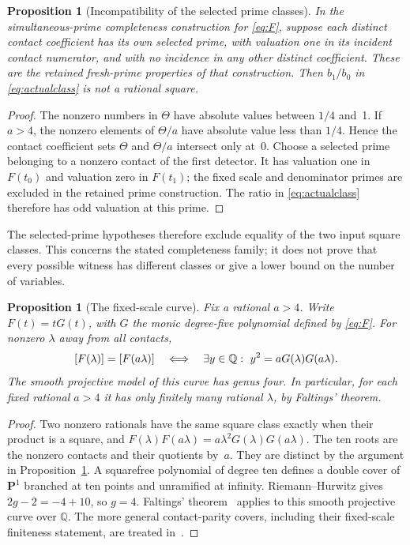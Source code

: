\documentclass[11pt,a4paper]{article}
\newtheorem{proposition}[theorem]{Proposition}
\theoremstyle{definition}\newtheorem{definition}[theorem]{Definition}
\theoremstyle{remark}\newtheorem{remark}[theorem]{Remark}
\newcommand{\Q}{\mathbb Q}\newcommand{\Z}{\mathbb Z}
\begin{document}
\begin{proposition}[Incompatibility of the selected prime classes]
\label{prop:fresh}
In the simultaneous-prime completeness construction for
\eqref{eq:F}, suppose each distinct contact coefficient has its own
selected prime, with valuation one in its incident contact numerator,
and with no incidence in any other distinct coefficient. These are the
retained fresh-prime properties of that construction. Then
$b_1/b_0$ in \eqref{eq:actualclass} is not a rational square.
\end{proposition}
\begin{proof}
The nonzero numbers in $\Theta$ have absolute values between $1/4$ and~1.
If $a>4$, the nonzero elements of $\Theta/a$ have absolute value less
than $1/4$. Hence the contact coefficient sets $\Theta$ and $\Theta/a$
intersect only at~0. Choose a selected prime belonging to a nonzero
contact of the first detector. It has valuation one in $F(t_0)$ and
valuation zero in $F(t_1)$; the fixed scale and denominator primes are
excluded in the retained prime construction. The ratio in
\eqref{eq:actualclass} therefore has odd valuation at this prime.
\end{proof}

The selected-prime hypotheses therefore exclude equality of the
two input square classes. This concerns the stated completeness
family; it does not prove that every possible witness has different
classes or give a lower bound on the number of variables.

\begin{proposition}[The fixed-scale curve]\label{prop:genus}
Fix a rational $a>4$. Write $F(t)=tG(t)$, with $G$ the monic degree-five
polynomial defined by \eqref{eq:F}. For nonzero $\lambda$ away from
all contacts,
\[
 \sqcl {F(\lambda)}=\sqcl {F(a\lambda)}
 \quad\Longleftrightarrow\quad
 \exists y\in\Q:\ y^2=aG(\lambda)G(a\lambda).
\]
The smooth projective model of this curve has genus four. In particular,
for each fixed rational $a>4$ it has only finitely many rational
$\lambda$, by Faltings' theorem.
\end{proposition}
\begin{proof}
Two nonzero rationals have the same square class exactly when their
product is a square, and
$F(\lambda)F(a\lambda)=a\lambda^2G(\lambda)G(a\lambda)$.
The ten roots are the nonzero contacts and their quotients by~$a$.
They are distinct by the argument in Proposition~\ref{prop:fresh}.
A squarefree polynomial of degree ten defines a double cover of
$\mathbf P^1$ branched at ten points and unramified at infinity.
Riemann--Hurwitz gives $2g-2=-4+10$, so $g=4$.
Faltings' theorem~\cite{Faltings} applies to this smooth projective
curve over $\Q$. The more general contact-parity covers, including
their fixed-scale finiteness statement, are treated in~\cite{ContactCovers}.
\end{proof}
\end{document}
